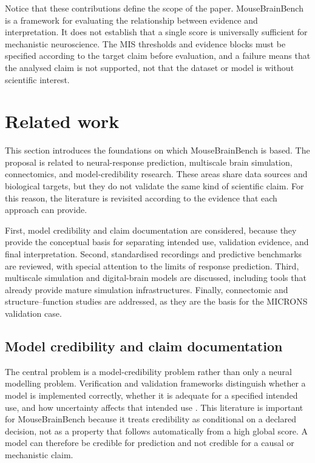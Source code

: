 \documentclass[a4paper,fleqn]{cas-sc}
\begin{document}
Notice that these contributions define the scope of the paper. MouseBrainBench
is a framework for evaluating the relationship between evidence and
interpretation. It does not establish that a single score is universally
sufficient for mechanistic neuroscience. The MIS thresholds and evidence blocks
must be specified according to the target claim before evaluation, and a failure
means that the analysed claim is not supported, not that the dataset or model is
without scientific interest.

\section{Related work}
\label{sec:related-work}

This section introduces the foundations on which MouseBrainBench is based. The
proposal is related to neural-response prediction, multiscale brain simulation,
connectomics, and model-credibility research. These areas share data sources and
biological targets, but they do not validate the same kind of scientific claim.
For this reason, the literature is revisited according to the evidence that each
approach can provide.

First, model credibility and claim documentation are considered, because they
provide the conceptual basis for separating intended use, validation evidence,
and final interpretation. Second, standardised recordings and predictive
benchmarks are reviewed, with special attention to the limits of response
prediction. Third, multiscale simulation and digital-brain models are discussed,
including tools that already provide mature simulation infrastructures. Finally,
connectomic and structure--function studies are addressed, as they are the basis
for the MICRONS validation case.

\subsection{Model credibility and claim documentation}
\label{subsec:model-credibility}

The central problem is a model-credibility problem rather than only a neural
modelling problem. Verification and validation frameworks distinguish whether a
model is implemented correctly, whether it is adequate for a specified intended
use, and how uncertainty affects that intended use
\citep{asme2018vv40,oberkampf2010verification,sargent2013verification,riedmaier2021vvuq}.
This literature is important for MouseBrainBench because it treats credibility as
conditional on a declared decision, not as a property that follows automatically
from a high global score. A model can therefore be credible for prediction and
not credible for a causal or mechanistic claim.
\end{document}

